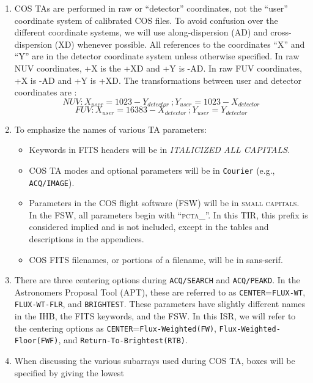 \documentclass{stsci_report}
\newcommand{\tacq}[1]{\texttt{ACQ/#1}}
\begin{document}
\begin{enumerate}
	\item{COS TAs are performed in raw or ``detector'' coordinates, not the ``user'' coordinate system of calibrated
		COS files. To avoid confusion over the different coordinate systems, we will use along-dispersion (AD) and cross-dispersion (XD) whenever possible.
		All references to the coordinates ``X'' and ``Y'' are in the detector coordinate system unless otherwise specified.
		In raw NUV coordinates, +X is the +XD and +Y is -AD. In raw FUV coordinates, +X is -AD and +Y is +XD.
		The transformations between user and detector coordinates are :
		\begin{equation} NUV: X_{user} = 1023 - Y_{detector} \ ; Y_{user} = 1023-X_{detector} \end{equation}
		\begin{equation} FUV: X_{user} = 16383 - X_{detector} \ ; Y_{user} = Y_{detector} \end{equation}
		}
	\item{To emphasize the names of various TA parameters:
		\begin{itemize}
			\item{Keywords in FITS headers will be in \textit{ITALICIZED ALL CAPITALS}.}
			\item{COS TA modes and optional parameters will be in \texttt{Courier} (e.g., 	\tacq{IMAGE}).}
			\item{Parameters in the COS flight software (FSW) will be in \textsc{small capitals}.
In the FSW, all parameters begin with ``\textsc{pcta\_}''. In this TIR, this prefix is considered implied and is not included,
except in the tables and descriptions in the appendices.}
			\item{COS FITS filenames, or portions of a filename, will be in {\sf sans-serif}.}
		\end{itemize}
	}
	\item{There are three centering options during \tacq{SEARCH} and \tacq{PEAKD}. In the Astronomers Proposal Tool (APT), these are
		referred to as \texttt{CENTER}=\texttt{FLUX-WT}, \texttt{FLUX-WT-FLR}, and \texttt{BRIGHTEST}.
		These parameters have slightly different names in the IHB, the FITS keywords, and the FSW.
		In this ISR, we will refer to the centering options as \texttt{CENTER}=\texttt{Flux-Weighted(FW)}, \texttt{Flux-Weighted-Floor(FWF)}, and \texttt{Return-To-Brightest(RTB)}.
	}
	\item{When discussing the various subarrays used during COS TA, boxes will be specified by giving the lowest
}
\end{enumerate}
\end{document}
